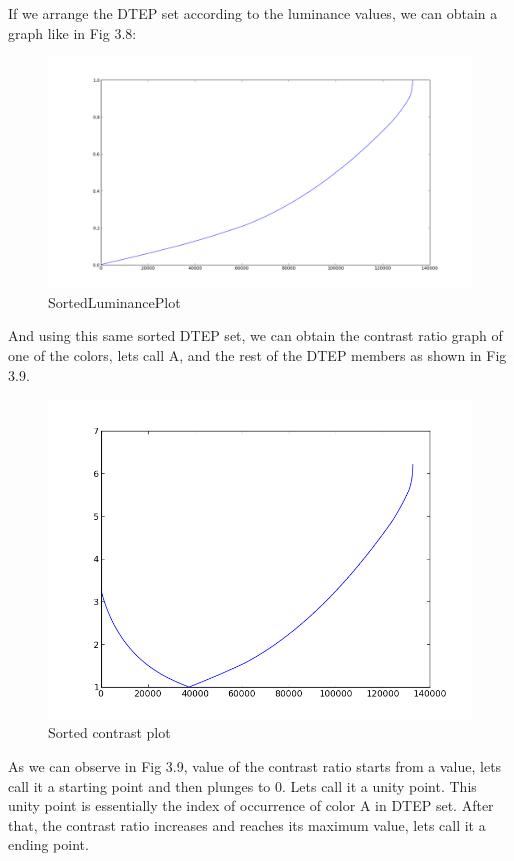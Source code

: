 If we arrange the DTEP set according to the luminance values, we can obtain a graph like in Fig 3.8:
\begin{figure}[!htb]
\centering
\includegraphics[width=\linewidth]{SortedLuminanceDTEP.png}
\caption{SortedLuminancePlot}
\label{fig:LuminanceSortedPlot}
\end{figure}



And using this same sorted DTEP set, we can obtain the contrast ratio graph of one of the colors, lets call A, and the rest of the DTEP members as shown in Fig 3.9.
\begin{figure}[!htb]
\centering
\includegraphics[width=\linewidth]{SortedContrast.png}
\caption{Sorted contrast plot}
\label{fig:SortedContrastPlot}
\end{figure}

As we can observe in Fig 3.9, value of the contrast ratio starts from a value, lets call it a starting point and then plunges to $0$. Lets call it a unity point. This unity point is essentially the index of occurrence of color A in DTEP set. After that, the contrast ratio increases and reaches its maximum value, lets call it a ending point.


